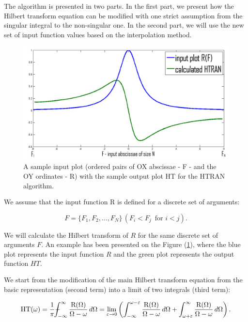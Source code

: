 \documentclass[12pt,twoside,a4paper]{article}
\numberwithin{equation}{subsection}
\numberwithin{figure}{subsection}
\def\Xint#1{\mathchoice
{\XXint\displaystyle\textstyle{#1}}%
{\XXint\textstyle\scriptstyle{#1}}%
{\XXint\scriptstyle\scriptscriptstyle{#1}}%
{\XXint\scriptscriptstyle\scriptscriptstyle{#1}}%
\!\int}
\def\XXint#1#2#3{{\setbox0=\hbox{$#1{#2#3}{\int}$ }\vcenter{\hbox{$#2#3$ }}\kern-.6\wd0}}
\def\dashint{\Xint-}
\begin{document}
The algorithm is presented in two parts. In the first part, we present how the Hilbert transform equation can be modified with one strict
assumption from the singular integral to the non-singular one. In the second part, we will use the new set of input function
values based on the interpolation method.

\begin{figure}
	\includegraphics[width=150mm]{img/htran_illustration.png}
	\caption{A sample input plot (ordered pairs of OX abscissae - F - and the OY ordinates - R) with the sample output plot HT for the HTRAN
	algorithm. \label{fig:htran_illustration}} 
\end{figure}

We assume that the input function R is defined for a discrete set of arguments:
 
\begin{equation} \label{eq:htran_arguments}
	F = \{ F_1, F_2, \ldots, F_N \} \, (F_i < F_j \, \text{ for } i < j) . 
\end{equation}

We will calculate the Hilbert transform of $R$ for the same discrete set of arguments $F$. An example has been presented on
the Figure (\ref{fig:htran_illustration}), where the blue plot represents the input function $R$ and the green plot represents the output
function $HT$.

We start from the modification of the main Hilbert transform equation from the basic representation (second term) into a limit of two
integrals (third term):

\begin{equation} \label{eq:htran_first_modification}
  \mathrm{HT}(\omega )
  = \frac{1}{\pi } {\dashint_{ - \infty }^{\infty }  \frac {\mathrm{R}(\Omega )}{\Omega - \omega }\,d\Omega }
  = {\lim_{\varepsilon \rightarrow 0}} 
  	\left( \int_{ - \infty }^{\omega - \varepsilon } \frac {\mathrm{R}(\Omega )}{\Omega - \omega }\,d\Omega  
  	     + \int_{ \omega + \varepsilon }^{ \infty  } \frac {\mathrm{R}(\Omega )}{\Omega - \omega }\,d\Omega \right) .
\end{equation} 
\end{document}
